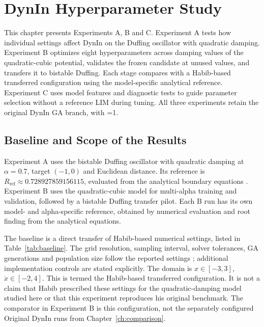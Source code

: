 \chapter{DynIn Hyperparameter Study}
\label{ch:hyperparameters}

\begin{bluerevision}
This chapter presents Experiments A, B and C. Experiment A tests how individual settings affect DynIn on the Duffing oscillator with quadratic damping. Experiment B optimizes eight hyperparameters across damping values of the quadratic-cubic potential, validates the frozen candidate at unused values, and transfers it to bistable Duffing. Each stage compares with a Habib-based transferred configuration using the model-specific analytical reference. Experiment C uses model features and diagnostic tests to guide parameter selection without a reference LIM during tuning. All three experiments retain the original DynIn GA branch, with =1.
\end{bluerevision}

\section{Baseline and Scope of the Results}
\label{sec:study-baseline}

\begin{bluerevision}
Experiment A uses the bistable Duffing oscillator with quadratic damping at $\alpha=0.7$, target $(-1,0)$ and Euclidean distance. Its reference is $R_{\mathrm{ref}}\approx0.728927859156115$, evaluated from the analytical boundary equations \cite{ref13}. Experiment B uses the quadratic-cubic model for multi-alpha training and validation, followed by a bistable Duffing transfer pilot. Each B run has its own model- and alpha-specific reference, obtained by numerical evaluation and root finding from the analytical equations.

The baseline is a direct transfer of Habib-based numerical settings, listed in Table~\ref{tab:baseline}. The grid resolution, sampling interval, solver tolerances, GA generations and population size follow the reported settings \cite[Table~1]{ref12}; additional implementation controls are stated explicitly. The domain is $x\in[-3,3]$, $\dot{x}\in[-2,4]$. This is termed the Habib-based transferred configuration. It is not a claim that Habib prescribed these settings for the quadratic-damping model studied here or that this experiment reproduces his original benchmark. The comparator in Experiment B is this configuration, not the separately configured Original DynIn runs from Chapter~\ref{ch:comparison}.
\end{bluerevision}

